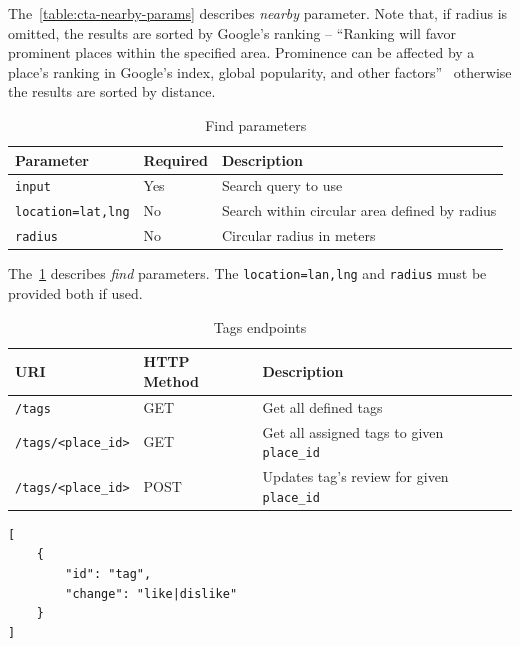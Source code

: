 The~\cref{table:cta-nearby-params} describes \textit{nearby} parameter. Note that, if radius is omitted, the results are sorted by Google's ranking -- ``Ranking will favor prominent places within the specified area. Prominence can be affected by a place's ranking in Google's index, global popularity, and other factors''~\cite{google-places-api-nearby-req} otherwise the results are sorted by distance. 
\begin{table}[ht]
\centering
\begin{tabularx}{\textwidth}{|l|l|X|}
\hline
\textbf{Parameter} & \textbf{Required} & \textbf{Description} \\ \hline
\verb|input| & Yes & Search query to use \\ \hline
\verb|location=lat,lng| & No & Search within circular area defined by radius \\ \hline
\verb|radius| & No & Circular radius in meters\\ \hline
\end{tabularx}
\caption{Find parameters}
\label{table:cta-find-params}
\end{table}

The~\cref{table:cta-find-params} describes \textit{find} parameters. The \verb|location=lan,lng| and \verb|radius| must be provided both if used. 
\begin{table}[ht]
\centering
\begin{tabularx}{\textwidth}{|l|l|X|}
\hline
\textbf{URI} & \textbf{HTTP Method} & \textbf{Description} \\ \hline
\verb|/tags| & GET & Get all defined tags \\ \hline
\verb|/tags/<place_id>| & GET & Get all assigned tags to given \verb|place_id| \\ \hline
\verb|/tags/<place_id>| & POST & Updates tag's review for given \verb|place_id| \\ \hline
\end{tabularx}
\caption{Tags endpoints}
\label{table:cta-tags}
\end{table}

\begin{listing}[ht]
\begin{verbatim}
[
    {
        "id": "tag",
        "change": "like|dislike"
    }
]
\end{verbatim}
\caption{Tag update content example}
\label{listing:tag-update-post}
\end{listing}


